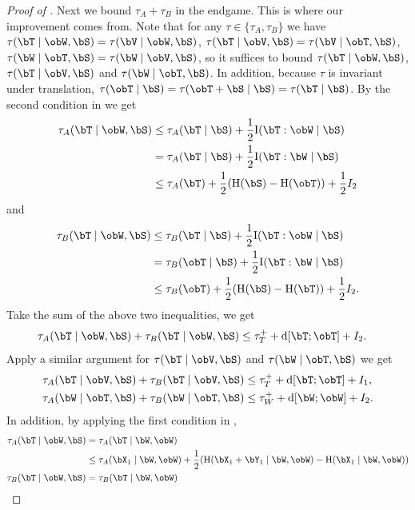 \documentclass{article}
\DeclarePairedDelimiter{\paren}{(}{)}
\DeclarePairedDelimiter{\sqpar}{[}{]}
\newcommand{\ent}{\mathrm{H}\paren}
\newcommand{\info}{\mathrm{I}\paren}
\newcommand{\Ruz}{\mathrm{d}\sqpar}
\begin{document}
\begin{proof}[Proof of ]
Next we bound $\tau_A+\tau_B$ in the endgame. This is where our improvement comes from. Note that for any $\tau\in\{\tau_A,\tau_B\}$ we have $\tau(\bT\mid\obW,\bS)=\tau(\bV\mid\obW,\bS)$, $\tau(\bT\mid\obV,\bS)=\tau(\bV\mid\obT,\bS)$, $\tau(\bW\mid\obT,\bS)=\tau(\bW\mid\obV,\bS)$, so it suffices to bound $\tau(\bT\mid\obW,\bS)$, $\tau(\bT\mid\obV,\bS)$ and $\tau(\bW\mid\obT,\bS)$. In addition, because $\tau$ is invariant under translation, $\tau(\obT\mid\bS)=\tau(\obT+\bS\mid\bS)=\tau(\bT\mid\bS)$. By the second condition in  we get
\begin{align*}
\tau_A(\bT\mid\obW,\bS) &\le \tau_A(\bT\mid\bS) + \frac{1}{2}\info{\bT:\obW\mid \bS} \\
                    &=\tau_A(\bT\mid\bS) + \frac{1}{2}\info{\bT:\bW\mid \bS} \\
                     &\le  \tau_A(\bT) + \frac{1}{2}(\ent{\bS}-\ent{\obT}) + \frac{1}{2}I_2
\end{align*}
and
\begin{align*}
\tau_B(\bT\mid\obW,\bS) &\le \tau_B(\bT\mid\bS) + \frac{1}{2}\info{\bT:\obW\mid \bS} \\
                        &= \tau_B(\obT\mid\bS) + \frac{1}{2}\info{\bT:\bW\mid \bS} \\
                     &\le  \tau_B(\obT) + \frac{1}{2}(\ent{\bS}-\ent{\bT}) + \frac{1}{2}I_2.
\end{align*}
Take the sum of the above two inequalities, we get 
\begin{align}
\tau_A(\bT\mid\obW,\bS)+\tau_B(\bT\mid\obW,\bS) &\le  \tau_T^+ + \Ruz{\bT;\obT} + I_2.\label{eq:+1}
\end{align}
Apply a similar argument for $\tau(\bT\mid\obV,\bS)$ and $\tau(\bW\mid\obT,\bS)$ we get 
\begin{align}
\tau_A(\bT\mid\obV,\bS)+\tau_B(\bT\mid\obV,\bS) &\le  \tau_T^+ + \Ruz{\bT;\obT} + I_1,\label{eq:+2}\\
\tau_A(\bW\mid\obT,\bS)+\tau_B(\bW\mid\obT,\bS) &\le  \tau_W^+ + \Ruz{\bW;\obW} + I_2.\label{eq:+3}
\end{align}
In addition, by applying the first condition in , 
\begin{align*}
\tau_A(\bT\mid\obW,\bS) &= \tau_A(\bT\mid \bW,\obW)\\
                    &\le \tau_A(\bX_1\mid\bW,\obW) + \frac{1}{2}(\ent{\bX_1+\bY_1\mid\bW,\obW}-\ent{\bX_1\mid\bW,\obW})\\
\tau_B(\bT\mid\obW,\bS) &= \tau_B(\bT\mid \bW,\obW)\\

\end{align*}
\end{proof}
\end{document}
